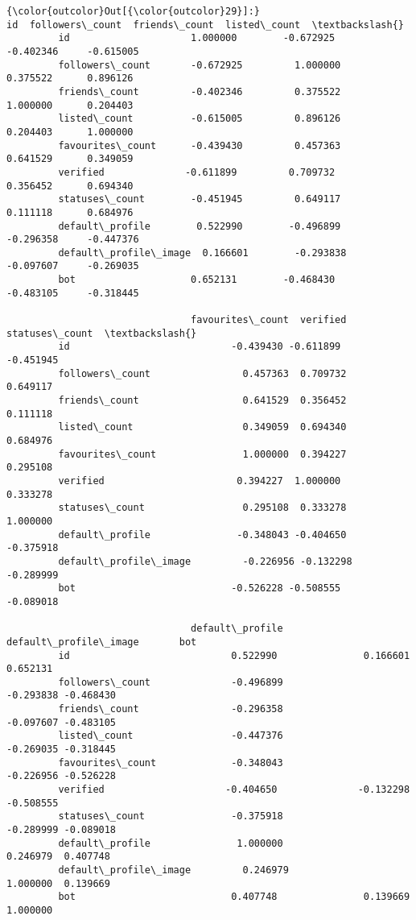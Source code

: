 \documentclass[11pt]{article}
\begin{document}
\begin{Verbatim}[commandchars=\\\{\}]
{\color{outcolor}Out[{\color{outcolor}29}]:}                              id  followers\_count  friends\_count  listed\_count  \textbackslash{}
         id                     1.000000        -0.672925      -0.402346     -0.615005   
         followers\_count       -0.672925         1.000000       0.375522      0.896126   
         friends\_count         -0.402346         0.375522       1.000000      0.204403   
         listed\_count          -0.615005         0.896126       0.204403      1.000000   
         favourites\_count      -0.439430         0.457363       0.641529      0.349059   
         verified              -0.611899         0.709732       0.356452      0.694340   
         statuses\_count        -0.451945         0.649117       0.111118      0.684976   
         default\_profile        0.522990        -0.496899      -0.296358     -0.447376   
         default\_profile\_image  0.166601        -0.293838      -0.097607     -0.269035   
         bot                    0.652131        -0.468430      -0.483105     -0.318445   
         
                                favourites\_count  verified  statuses\_count  \textbackslash{}
         id                            -0.439430 -0.611899       -0.451945   
         followers\_count                0.457363  0.709732        0.649117   
         friends\_count                  0.641529  0.356452        0.111118   
         listed\_count                   0.349059  0.694340        0.684976   
         favourites\_count               1.000000  0.394227        0.295108   
         verified                       0.394227  1.000000        0.333278   
         statuses\_count                 0.295108  0.333278        1.000000   
         default\_profile               -0.348043 -0.404650       -0.375918   
         default\_profile\_image         -0.226956 -0.132298       -0.289999   
         bot                           -0.526228 -0.508555       -0.089018   
         
                                default\_profile  default\_profile\_image       bot  
         id                            0.522990               0.166601  0.652131  
         followers\_count              -0.496899              -0.293838 -0.468430  
         friends\_count                -0.296358              -0.097607 -0.483105  
         listed\_count                 -0.447376              -0.269035 -0.318445  
         favourites\_count             -0.348043              -0.226956 -0.526228  
         verified                     -0.404650              -0.132298 -0.508555  
         statuses\_count               -0.375918              -0.289999 -0.089018  
         default\_profile               1.000000               0.246979  0.407748  
         default\_profile\_image         0.246979               1.000000  0.139669  
         bot                           0.407748               0.139669  1.000000  
\end{Verbatim}
            
\end{document}

